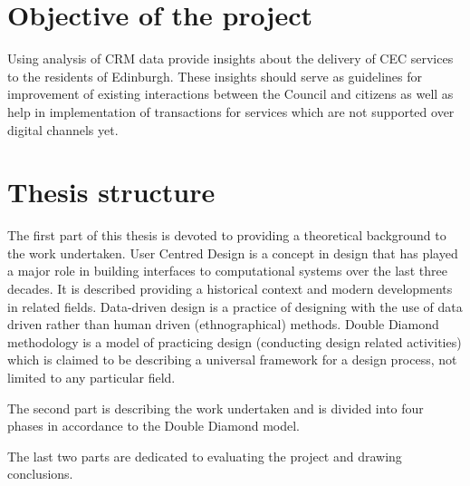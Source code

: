 	\section{Objective of the project}

Using analysis of CRM data provide insights about the delivery of CEC services to the residents of Edinburgh. These insights should serve as guidelines for improvement of existing interactions between the Council and citizens as well as help in implementation of transactions for services which are not supported over digital channels yet.

	\section{Thesis structure}

The first part of this thesis is devoted to providing a theoretical background to the work undertaken. User Centred Design is a concept in design that has played a major role in building interfaces to computational systems over the last three decades. It is described providing a historical context and modern developments in related fields. Data-driven design is a practice of designing with the use of data driven rather than human driven (ethnographical) methods. Double Diamond methodology is a model of practicing design (conducting design related activities) which is claimed to be describing a universal framework for a design process, not limited to any particular field.

The second part is describing the work undertaken and is divided into four phases in accordance to the Double Diamond model.

The last two parts are dedicated to evaluating the project and drawing conclusions.